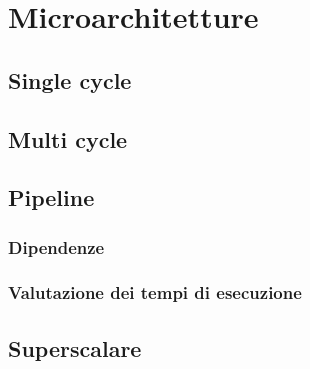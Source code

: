 \section{Microarchitetture}
\subsection{Single cycle}
\subsection{Multi cycle}
\subsection{Pipeline}
\subsubsection{Dipendenze}
\subsubsection{Valutazione dei tempi di esecuzione}
\subsection{Superscalare}
